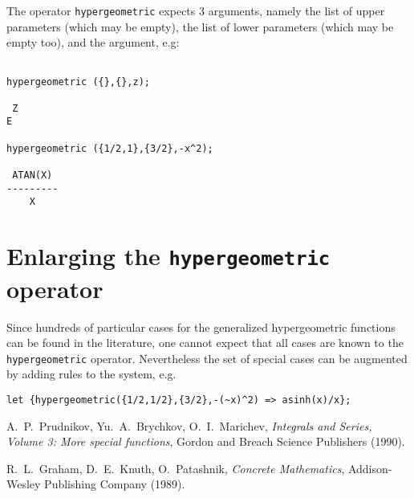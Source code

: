 The operator {\tt hypergeometric} expects 3 arguments, namely the
list of upper parameters (which may be empty), the list of lower
parameters (which may be empty too), and the argument, e.g:

\begin{verbatim}

hypergeometric ({},{},z);

 Z
E

hypergeometric ({1/2,1},{3/2},-x^2);

 ATAN(X)
---------
    X
\end{verbatim}

\section{Enlarging the {\tt hypergeometric} operator}

Since hundreds of particular cases for the generalized hypergeometric
functions can be found in the literature, one cannot expect that all
cases are known to the {\tt hypergeometric} operator.
Nevertheless the set of special cases can be augmented by adding
rules to the \REDUCE{} system, e.g.

\begin{verbatim}
let {hypergeometric({1/2,1/2},{3/2},-(~x)^2) => asinh(x)/x};
\end{verbatim}

\begin{thebibliography}{9}

 A.~P.~Prudnikov, Yu.~A.~Brychkov, O.~I.~Marichev,
{\em Integrals and Series, Volume 3: More special functions},
Gordon and Breach Science Publishers (1990).

 R.~L.~Graham, D.~E.~Knuth, O.~Patashnik,
{\em Concrete Mathematics}, Addison-Wesley Publishing Company (1989).

\end{thebibliography}

